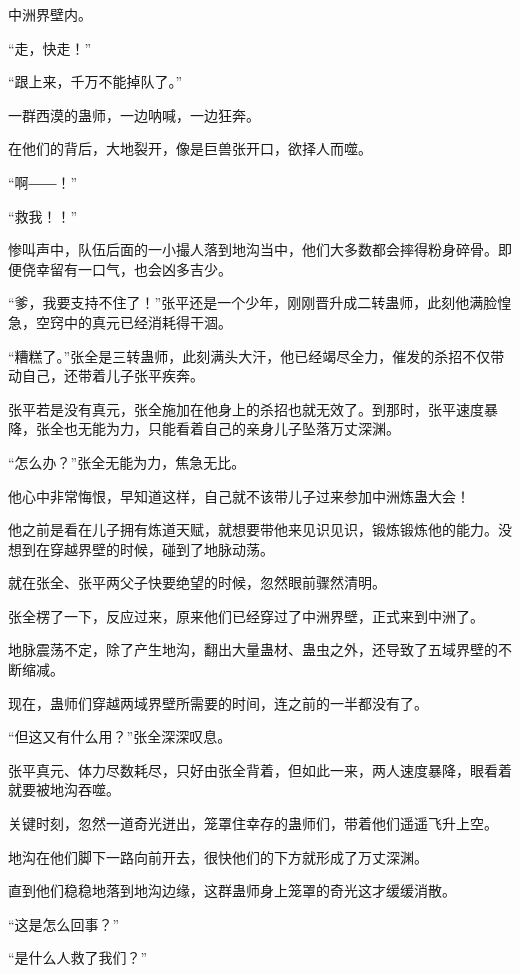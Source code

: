 
\begin{this_body}

中洲界壁内。

“走，快走！”

“跟上来，千万不能掉队了。”

一群西漠的蛊师，一边呐喊，一边狂奔。

在他们的背后，大地裂开，像是巨兽张开口，欲择人而噬。

“啊――！”

“救我！！”

惨叫声中，队伍后面的一小撮人落到地沟当中，他们大多数都会摔得粉身碎骨。即便侥幸留有一口气，也会凶多吉少。

“爹，我要支持不住了！”张平还是一个少年，刚刚晋升成二转蛊师，此刻他满脸惶急，空窍中的真元已经消耗得干涸。

“糟糕了。”张全是三转蛊师，此刻满头大汗，他已经竭尽全力，催发的杀招不仅带动自己，还带着儿子张平疾奔。

张平若是没有真元，张全施加在他身上的杀招也就无效了。到那时，张平速度暴降，张全也无能为力，只能看着自己的亲身儿子坠落万丈深渊。

“怎么办？”张全无能为力，焦急无比。

他心中非常悔恨，早知道这样，自己就不该带儿子过来参加中洲炼蛊大会！

他之前是看在儿子拥有炼道天赋，就想要带他来见识见识，锻炼锻炼他的能力。没想到在穿越界壁的时候，碰到了地脉动荡。

就在张全、张平两父子快要绝望的时候，忽然眼前骤然清明。

张全楞了一下，反应过来，原来他们已经穿过了中洲界壁，正式来到中洲了。

地脉震荡不定，除了产生地沟，翻出大量蛊材、蛊虫之外，还导致了五域界壁的不断缩减。

现在，蛊师们穿越两域界壁所需要的时间，连之前的一半都没有了。

“但这又有什么用？”张全深深叹息。

张平真元、体力尽数耗尽，只好由张全背着，但如此一来，两人速度暴降，眼看着就要被地沟吞噬。

关键时刻，忽然一道奇光迸出，笼罩住幸存的蛊师们，带着他们遥遥飞升上空。

地沟在他们脚下一路向前开去，很快他们的下方就形成了万丈深渊。

直到他们稳稳地落到地沟边缘，这群蛊师身上笼罩的奇光这才缓缓消散。

“这是怎么回事？”

“是什么人救了我们？”


\end{this_body}
